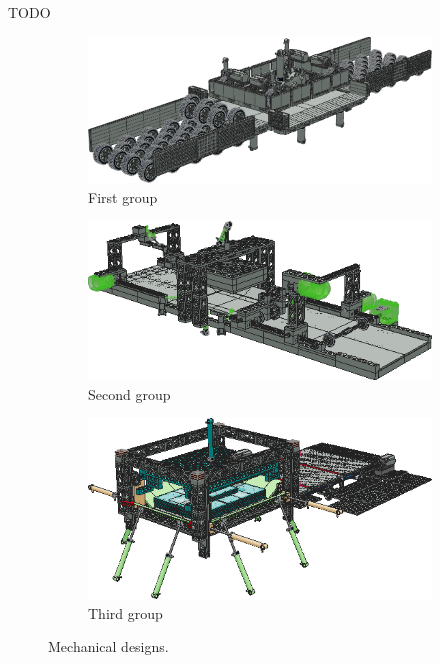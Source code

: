 \documentclass{PDS}
\begin{document}
TODO

\begin{figure}[htbp]
    \begin{subfigure}[b]{0.3\textwidth}
        \includegraphics[width=\textwidth]{./figures/paper_1.png}
        \caption{First group}
        \label{fig:paper_1}
    \end{subfigure}
    \hfill
    \begin{subfigure}[b]{0.3\textwidth}
        \includegraphics[width=\textwidth]{./figures/paper_2.png}
        \caption{Second group}
        \label{fig:paper_2}
    \end{subfigure}
    \hfill
    \begin{subfigure}[b]{0.3\textwidth}
        \includegraphics[width=\textwidth]{./figures/paper_3.png}
        \caption{Third group}
        \label{fig:paper_3}
    \end{subfigure}
    \caption{Mechanical designs.}
    \label{fig:paper}
\end{figure}
\end{document}
